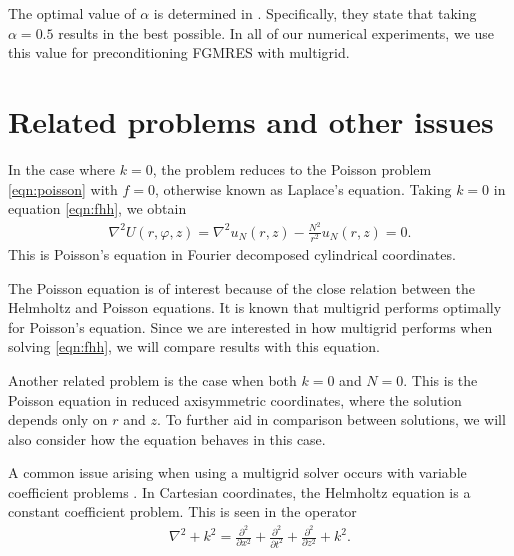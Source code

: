 The optimal value of $\alpha$ is determined in \cite{cslp2}.
Specifically, they state that taking $\alpha=0.5$ results in the best possible.
In all of our numerical experiments, we use this value for preconditioning FGMRES with multigrid.









\section{Related problems and other issues}

In the case where $k=0$, the problem reduces to the Poisson problem \eqref{eqn:poisson} with $f=0$, otherwise known as Laplace's equation.
Taking $k=0$ in equation \eqref{eqn:fhh}, we obtain
\begin{align}
	\nabla^2 U(r,\varphi,z) = \nabla^2 u_N(r,z) - \frac{N^2}{r^2} u_N(r,z) = 0. \label{eqn:fp}
\end{align}
This is Poisson's equation in Fourier decomposed cylindrical coordinates.

The Poisson equation is of interest because of the close relation between the Helmholtz and Poisson equations.
It is known that multigrid performs optimally for Poisson's equation.
Since we are interested in how multigrid performs when solving \eqref{eqn:fhh}, we will compare results with this equation.

Another related problem is the case when both $k=0$ and $N=0$.
This is the Poisson equation in reduced axisymmetric coordinates, where the solution depends only on $r$ and $z$.
To further aid in comparison between solutions, we will also consider how the equation behaves in this case.



A common issue arising when using a multigrid solver occurs with variable coefficient problems \cite{briggs}.
In Cartesian coordinates, the Helmholtz equation is a constant coefficient problem.
This is seen in the operator
\begin{align}
	\nabla^2 + k^2 = \frac{\partial^2}{\partial x^2} + \frac{\partial^2}{\partial t^2} + \frac{\partial^2}{\partial z^2} + k^2.
\end{align}

